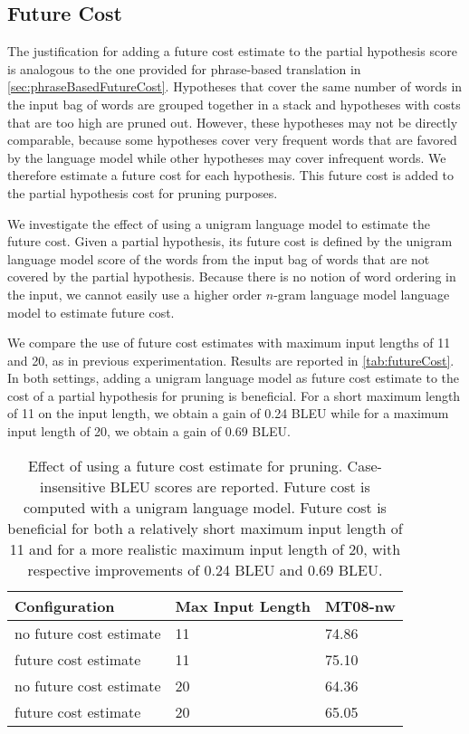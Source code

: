 \subsection{Future Cost}
\label{sec:gyroFutureCost}

The justification for adding a future cost estimate to the partial
hypothesis score is analogous to the one provided for phrase-based
translation in \autoref{sec:phraseBasedFutureCost}.
Hypotheses that
cover the same number of words in the input
bag of words are grouped together in a stack and
hypotheses with costs that are too high are pruned out.
However, these hypotheses may not be directly comparable, because
some hypotheses cover very frequent words that are favored by the
language model while other hypotheses may cover infrequent words.
We therefore estimate a future cost for each hypothesis.
This future cost is added to the partial hypothesis cost for pruning
purposes.

We investigate the effect of using a unigram language model to estimate
the future cost. Given a partial hypothesis, its future cost is defined
by the unigram language model score of the words from the input
bag of words that are not covered by the partial hypothesis.
Because there is no notion of word ordering in the input, we
cannot easily use a higher order $n$-gram language model
language model to estimate future cost.

We compare the use of future cost estimates with maximum input lengths
of 11 and 20, as in previous experimentation. Results are reported in \autoref{tab:futureCost}.
In both settings, adding a unigram language model as
future cost estimate to the cost of a partial hypothesis for pruning is beneficial.
For a short maximum length of 11 on the input length, we
obtain a gain of 0.24 BLEU while for a maximum input length
of 20, we obtain a gain of 0.69 BLEU.
%
\begin{table}
  \begin{center}
    \begin{tabular}{l|l|l}
      Configuration & Max Input Length & MT08-nw \\
      \hline
      no future cost estimate & 11 & 74.86 \\
      future cost estimate & 11 & 75.10 \\
      \hline
      no future cost estimate & 20 & 64.36 \\
      future cost estimate & 20 & 65.05 \\
    \end{tabular}
    \caption{Effect of using a future cost estimate for pruning.
      Case-insensitive BLEU scores are reported.
      Future cost is computed with a unigram language model.
      Future cost is beneficial for both a relatively short maximum input
      length of 11 and for a more realistic maximum input length of 20, with
      respective improvements of 0.24 BLEU and 0.69 BLEU.}
    \label{tab:futureCost}
  \end{center}
\end{table}

